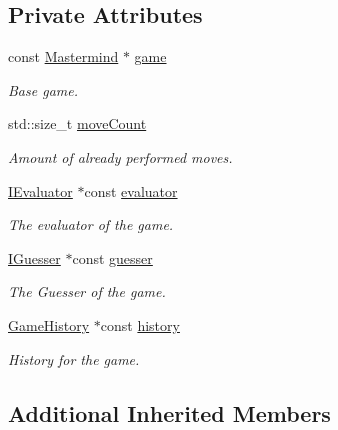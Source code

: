 \subsection*{Private Attributes}
\begin{DoxyCompactItemize}
\item 
const \hyperlink{classmastermind_1_1logic_1_1_mastermind}{Mastermind} $\ast$ \hyperlink{classmastermind_1_1logic_1_1_main_game_a063ce840892c07f33091a2e3935365ee}{game}
\begin{DoxyCompactList}\small\item\em Base game. \end{DoxyCompactList}\item 
std\+::size\+\_\+t \hyperlink{classmastermind_1_1logic_1_1_main_game_a9fff568bdb033edbfed54d3c4bc58ef3}{move\+Count}
\begin{DoxyCompactList}\small\item\em Amount of already performed moves. \end{DoxyCompactList}\item 
\hyperlink{classmastermind_1_1logic_1_1_i_evaluator}{I\+Evaluator} $\ast$const \hyperlink{classmastermind_1_1logic_1_1_main_game_a1ef0616e5078e9ac2b04cef8a83e0a8f}{evaluator}
\begin{DoxyCompactList}\small\item\em The evaluator of the game. \end{DoxyCompactList}\item 
\hyperlink{classmastermind_1_1logic_1_1_i_guesser}{I\+Guesser} $\ast$const \hyperlink{classmastermind_1_1logic_1_1_main_game_aacb345c4a133339f2680837ad256fa19}{guesser}
\begin{DoxyCompactList}\small\item\em The Guesser of the game. \end{DoxyCompactList}\item 
\hyperlink{classmastermind_1_1logic_1_1_game_history}{Game\+History} $\ast$const \hyperlink{classmastermind_1_1logic_1_1_main_game_a6620d1b001a306b469f9d5e88d540f0c}{history}
\begin{DoxyCompactList}\small\item\em History for the game. \end{DoxyCompactList}\end{DoxyCompactItemize}
\subsection*{Additional Inherited Members}


